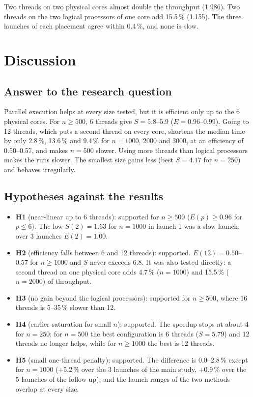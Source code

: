 \documentclass[11pt,a4paper]{article}
\begin{document}
Two threads on two physical cores almost double the throughput (1.986). Two threads on the two logical processors of one core add 15.5\,\% (1.155). The three launches of each placement agree within 0.4\,\%, and none is slow.

\section{Discussion}

\subsection{Answer to the research question}

Parallel execution helps at every size tested, but it is efficient only up to the 6 physical cores. For $n \ge 500$, 6 threads give $S = 5.8$--$5.9$ ($E = 0.96$--$0.99$). Going to 12 threads, which puts a second thread on every core, shortens the median time by only 2.8\,\%, 13.6\,\% and 9.4\,\% for $n = 1000$, 2000 and 3000, at an efficiency of 0.50--0.57, and makes $n = 500$ slower. Using more threads than logical processors makes the runs slower. The smallest size gains less (best $S = 4.17$ for $n = 250$) and behaves irregularly.

\subsection{Hypotheses against the results}\label{sec:hyp}

\begin{itemize}
  \item \textbf{H1} (near-linear up to 6 threads): supported for $n \ge 500$ ($E(p) \ge 0.96$ for $p \le 6$). The low $S(2) = 1.63$ for $n = 1000$ in launch 1 was a slow launch; over 3 launches $E(2) = 1.00$.
  \item \textbf{H2} (efficiency falls between 6 and 12 threads): supported. $E(12) = 0.50$--$0.57$ for $n \ge 1000$ and $S$ never exceeds 6.8. It was also tested directly: a second thread on one physical core adds 4.7\,\% ($n = 1000$) and 15.5\,\% ($n = 2000$) of throughput.
  \item \textbf{H3} (no gain beyond the logical processors): supported for $n \ge 500$, where 16 threads is 5--35\,\% slower than 12.
  \item \textbf{H4} (earlier saturation for small $n$): supported. The speedup stops at about 4 for $n = 250$; for $n = 500$ the best configuration is 6 threads ($S = 5.79$) and 12 threads no longer helps, while for $n \ge 1000$ the best is 12 threads.
  \item \textbf{H5} (small one-thread penalty): supported. The difference is 0.0--2.8\,\% except for $n = 1000$ (+5.2\,\% over the 3 launches of the main study, +0.9\,\% over the 5 launches of the follow-up), and the launch ranges of the two methods overlap at every size.
\end{itemize}
\end{document}
